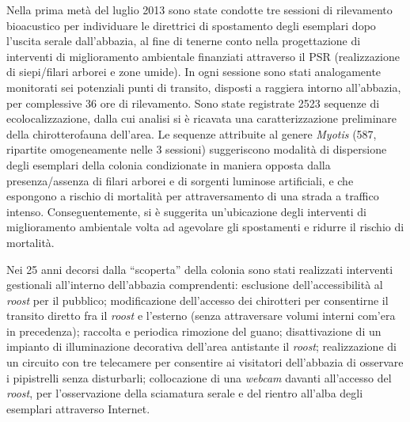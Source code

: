 {Nella prima metà del luglio 2013 sono state condotte tre sessioni di rilevamento bioacustico per individuare le direttrici di spostamento degli esemplari dopo l’uscita serale dall’abbazia, al fine di tenerne conto nella progettazione di interventi di miglioramento ambientale finanziati attraverso il PSR (realizzazione di siepi/filari arborei e zone umide). In ogni sessione sono stati analogamente monitorati sei potenziali punti di transito, disposti a raggiera intorno all’abbazia, per complessive 36 ore di rilevamento. Sono state registrate 2523 sequenze di ecolocalizzazione, dalla cui analisi si è ricavata una caratterizzazione preliminare della chirotterofauna dell’area. Le sequenze attribuite al genere \emph{Myotis} (587, ripartite omogeneamente nelle 3 sessioni) suggeriscono modalità di dispersione degli esemplari della colonia condizionate in maniera opposta dalla presenza/assenza di filari arborei e di sorgenti luminose artificiali, e che espongono a rischio di mortalità per attraversamento di una strada a traffico intenso. Conseguentemente, si è suggerita un’ubicazione degli interventi di miglioramento ambientale volta ad agevolare gli spostamenti e ridurre il rischio di mortalità.

Nei 25 anni decorsi dalla ``scoperta'' della colonia sono stati realizzati interventi gestionali all’interno dell’abbazia comprendenti: esclusione dell’accessibilità al \textit{roost} per il pubblico; modificazione dell’accesso dei chirotteri per consentirne il transito diretto fra il \textit{roost} e l’esterno (senza attraversare volumi interni com’era in precedenza); raccolta e periodica rimozione del guano; disattivazione di un impianto di illuminazione decorativa dell’area antistante il \textit{roost}; realizzazione di un circuito con tre telecamere per consentire ai visitatori dell’abbazia di osservare i pipistrelli senza disturbarli; collocazione di una \textit{webcam} davanti all’accesso del \textit{roost}, per l’osservazione della sciamatura serale e del rientro all’alba degli esemplari attraverso Internet. 
} %